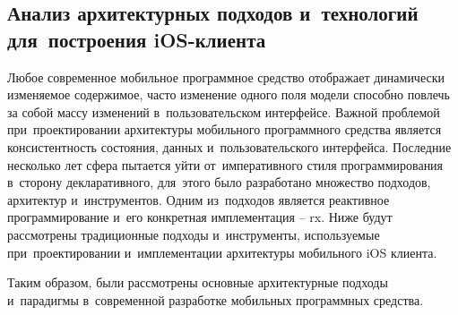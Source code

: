 \subsection{Анализ архитектурных подходов и~технологий для~построения iOS-клиента}
\label{sec:analysis:research:mobArch}

Любое современное мобильное программное средство отображает динамически изменяемое содержимое, часто изменение одного поля модели способно повлечь за собой массу изменений в~пользовательском интерфейсе. Важной проблемой при~проектировании архитектуры мобильного программного средства является консистентность состояния, данных и~пользовательского интерфейса. Последние несколько лет сфера пытается уйти от~императивного стиля программирования в~сторону декларативного, для~этого было разработано множество подходов, архитектур и~инструментов. Одним из~подходов является реактивное программирование и~его конкретная имплементация -- \gls{rx}. Ниже будут рассмотрены традиционные подходы и~инструменты, используемые при~проектировании и~имплементации архитектуры мобильного iOS клиента.








Таким образом, были рассмотрены основные архитектурные подходы и~парадигмы в~современной разработке мобильных программных средства.